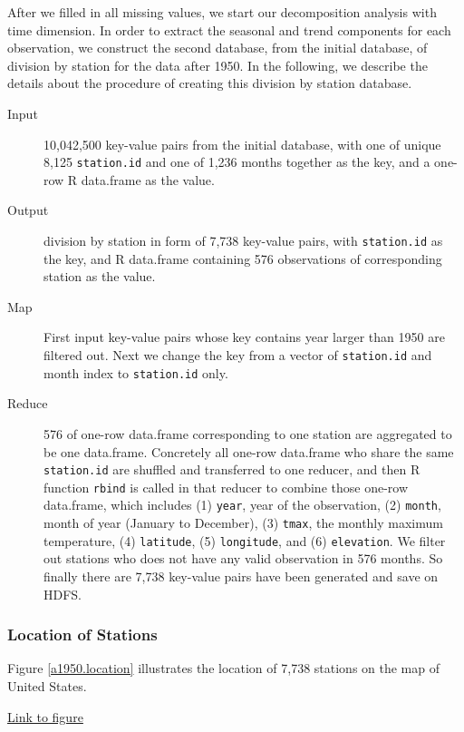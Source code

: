 After we filled in all missing values, we start our decomposition analysis with 
time dimension. In order to extract the seasonal and trend components for each 
observation, we construct the second database, from the initial database, of 
division by station for the data after 1950. In the following, we describe the 
details about the procedure of creating this division by station database.

\begin{description}
  \item[Input] 10,042,500 key-value pairs from the initial database, with one of
  unique 8,125 \texttt{station.id} and one of 1,236 months together as the key, 
  and a one-row R data.frame as the value. 
  \item[Output] division by station in form of 7,738 key-value pairs, with 
  \texttt{station.id} as the key, and R data.frame containing 576 observations 
  of corresponding station as the value.
  \item[Map]First input key-value pairs whose key contains year larger than 1950
  are filtered out. Next we change the key from a vector of \texttt{station.id} 
  and month index to \texttt{station.id} only. 
  \item[Reduce] 576 of one-row data.frame corresponding to one station are 
  aggregated to be one data.frame. Concretely all one-row data.frame who share
  the same \texttt{station.id} are shuffled and transferred to one reducer, and 
  then R function \texttt{rbind} is called in that reducer to combine those one-row 
  data.frame, which includes (1) \texttt{year}, year of the observation, 
  (2) \texttt{month}, month of year (January to December), (3) \texttt{tmax}, 
  the monthly maximum temperature, (4) \texttt{latitude}, (5) \texttt{longitude}, 
  and (6) \texttt{elevation}. We filter out stations who does not have any valid
  observation in 576 months. So finally there are 7,738 key-value pairs have been
  generated and save on HDFS. 
\end{description}

\subsubsection{Location of Stations}

Figure \href{../plots/a1950stations.pdf}{\ref*{a1950.location}} illustrates the 
location of 7,738 stations on the map of United States.

\begin{framed}
\begin{center}
  \href{../plots/a1950stations.pdf}{Link to figure}
  \label{a1950.location}
\end{center}
\end{framed}

